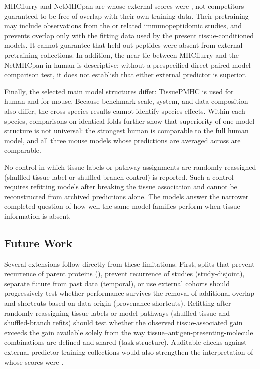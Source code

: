 MHCflurry and NetMHCpan are \plainGeneralPMHC{} whose external scores were \plainFrozen{}, not competitors guaranteed to be free of overlap with their own training data. Their pretraining may include observations from the \plainIEDB{} or related immunopeptidomic studies, and \plainPeptideOOF{} prevents overlap only with the fitting data used by the present tissue-conditioned models. It cannot guarantee that held-out peptides were absent from external pretraining collections. In addition, the near-tie between MHCflurry and the NetMHCpan \plainEL{} in human is descriptive; without a prespecified direct paired model-comparison test, it does not establish that either external predictor is superior.

Finally, the selected main model structures differ: TissuePMHC is used for human and \plainMMoE{} for mouse. Because benchmark scale, \plainMHC{} system, and data composition also differ, the cross-species results cannot identify species effects. Within each species, comparisons on identical \plainPeptideOOF{} folds further show that superiority of one model structure is not universal: the strongest human \plainAuxDual{} is comparable to the full human model, and all three mouse models whose predictions are averaged across \plainSeeds{} are comparable.

No control in which tissue labels or pathway assignments are randomly reassigned (shuffled-tissue-label or shuffled-branch control) is reported. Such a control requires refitting models after breaking the tissue association and cannot be reconstructed from archived predictions alone. The \plainMHCOnly{} models answer the narrower completed question of how well the same model families perform when tissue information is absent.

\subsection{Future Work}

Several extensions follow directly from these limitations. First, splits that prevent recurrence of parent proteins (\plainProteinDisjoint{}), prevent recurrence of studies (study-disjoint), separate future from past data (temporal), or use external cohorts should progressively test whether performance survives the removal of additional overlap and shortcuts based on data origin (provenance shortcuts). Refitting after randomly reassigning tissue labels or model pathways (shuffled-tissue and shuffled-branch refits) should test whether the observed tissue-associated gain exceeds the gain available solely from the way tissue--antigen-presenting-molecule combinations are defined and shared (task structure). Auditable checks against external predictor training collections would also strengthen the interpretation of \plainGeneralPMHC{} whose scores were \plainFrozen{}.

